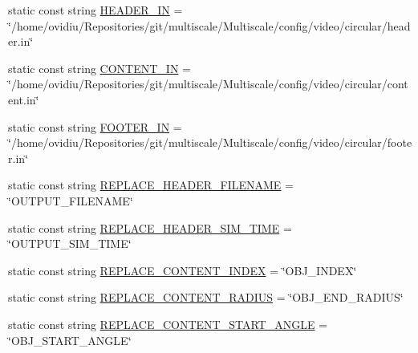 \begin{DoxyCompactItemize}
\item 
static const string \hyperlink{classmultiscale_1_1video_1_1PolarGnuplotScriptGenerator_acd5fb0e27c9f7857d68b7ec9cb62fb74}{H\-E\-A\-D\-E\-R\-\_\-\-I\-N} = \char`\"{}/home/ovidiu/Repositories/git/multiscale/Multiscale/config/video/circular/header.\-in\char`\"{}
\item 
static const string \hyperlink{classmultiscale_1_1video_1_1PolarGnuplotScriptGenerator_ad8fb67fe439899d85924bd7339b7d08c}{C\-O\-N\-T\-E\-N\-T\-\_\-\-I\-N} = \char`\"{}/home/ovidiu/Repositories/git/multiscale/Multiscale/config/video/circular/content.\-in\char`\"{}
\item 
static const string \hyperlink{classmultiscale_1_1video_1_1PolarGnuplotScriptGenerator_aae225d7380fd7815efa1aed69087e6b0}{F\-O\-O\-T\-E\-R\-\_\-\-I\-N} = \char`\"{}/home/ovidiu/Repositories/git/multiscale/Multiscale/config/video/circular/footer.\-in\char`\"{}
\item 
static const string \hyperlink{classmultiscale_1_1video_1_1PolarGnuplotScriptGenerator_af5f0a7c41016915eaa5756695f17fd4a}{R\-E\-P\-L\-A\-C\-E\-\_\-\-H\-E\-A\-D\-E\-R\-\_\-\-F\-I\-L\-E\-N\-A\-M\-E} = \char`\"{}O\-U\-T\-P\-U\-T\-\_\-\-F\-I\-L\-E\-N\-A\-M\-E\char`\"{}
\item 
static const string \hyperlink{classmultiscale_1_1video_1_1PolarGnuplotScriptGenerator_ab06a56e8ac6c117d9a3d1279bd114941}{R\-E\-P\-L\-A\-C\-E\-\_\-\-H\-E\-A\-D\-E\-R\-\_\-\-S\-I\-M\-\_\-\-T\-I\-M\-E} = \char`\"{}O\-U\-T\-P\-U\-T\-\_\-\-S\-I\-M\-\_\-\-T\-I\-M\-E\char`\"{}
\item 
static const string \hyperlink{classmultiscale_1_1video_1_1PolarGnuplotScriptGenerator_a0899b28bb340224529c005d262ffb09f}{R\-E\-P\-L\-A\-C\-E\-\_\-\-C\-O\-N\-T\-E\-N\-T\-\_\-\-I\-N\-D\-E\-X} = \char`\"{}O\-B\-J\-\_\-\-I\-N\-D\-E\-X\char`\"{}
\item 
static const string \hyperlink{classmultiscale_1_1video_1_1PolarGnuplotScriptGenerator_a2fcfd2afdf3aa1f35b18fc04946f40d2}{R\-E\-P\-L\-A\-C\-E\-\_\-\-C\-O\-N\-T\-E\-N\-T\-\_\-\-R\-A\-D\-I\-U\-S} = \char`\"{}O\-B\-J\-\_\-\-E\-N\-D\-\_\-\-R\-A\-D\-I\-U\-S\char`\"{}
\item 
static const string \hyperlink{classmultiscale_1_1video_1_1PolarGnuplotScriptGenerator_acb8550fbb7a7f199d01d77622b054e10}{R\-E\-P\-L\-A\-C\-E\-\_\-\-C\-O\-N\-T\-E\-N\-T\-\_\-\-S\-T\-A\-R\-T\-\_\-\-A\-N\-G\-L\-E} = \char`\"{}O\-B\-J\-\_\-\-S\-T\-A\-R\-T\-\_\-\-A\-N\-G\-L\-E\char`\"{}
\item 

\end{DoxyCompactItemize}

